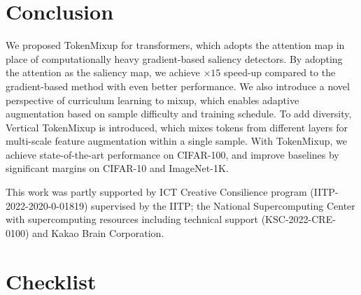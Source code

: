 \documentclass{article}
\begin{document}
  \vspace{-2mm}
\section{Conclusion}
\vspace{-3mm}
We proposed TokenMixup for transformers, which adopts the attention map in place of computationally heavy gradient-based saliency detectors.
By adopting the attention as the saliency map, we achieve $\times15$ speed-up compared to the gradient-based method with even better performance.
We also introduce a novel perspective of curriculum learning to mixup, which enables adaptive augmentation based on sample difficulty and training schedule.
To add diversity, Vertical TokenMixup is introduced, which mixes tokens from different layers for multi-scale feature augmentation within a single sample.
With TokenMixup, we achieve state-of-the-art performance on CIFAR-100, and improve baselines by significant margins on CIFAR-10 and ImageNet-1K. 



\begin{ack}
This work was partly supported by ICT Creative Consilience program (IITP-2022-2020-0-01819) supervised by the IITP; the National Supercomputing Center with
supercomputing resources including technical support (KSC-2022-CRE-0100) and Kakao Brain Corporation.
\end{ack}


%
 

{\small

}
\newpage

\section*{Checklist}
\end{document}
